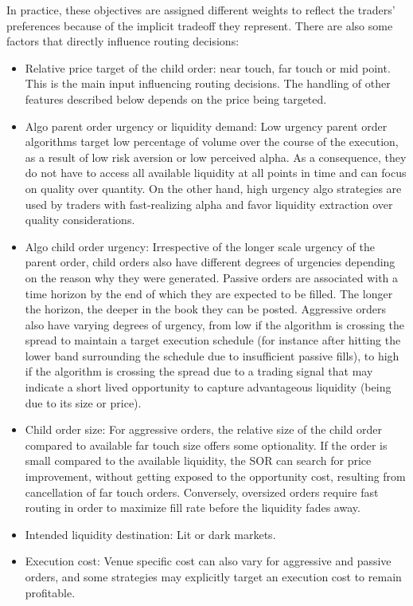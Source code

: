 In practice, these objectives are assigned different weights to reflect the traders' preferences because of the implicit tradeoff they represent. There are also some factors that directly influence routing decisions:


\begin{itemize}
\item Relative price target of the child order: near touch, far touch or mid point. This is the main input influencing routing decisions. The handling of other features described below depends on the price being targeted.

\item Algo parent order urgency or liquidity demand: Low urgency parent order algorithms target low percentage of volume over the course of the execution, as a result of low risk aversion or low perceived alpha. As a consequence, they do not have to access all available liquidity at all points in time and can focus on quality over quantity. On the other hand, high urgency algo strategies are used by traders with fast-realizing alpha and favor liquidity extraction over quality considerations.

\item Algo child order urgency: Irrespective of the longer scale urgency of the parent order, child orders also have different degrees of urgencies depending on the reason why they were generated. Passive orders are associated with a time horizon by the end of which they are expected to be filled. The longer the horizon, the deeper in the book they can be posted. Aggressive orders also have varying degrees of urgency, from low if the algorithm is crossing the spread to maintain a target execution schedule (for instance after hitting the lower band surrounding the schedule due to insufficient passive fills), to high if the algorithm is crossing the spread due to a trading signal that may indicate a short lived opportunity to capture advantageous liquidity (being due to its size or price).

\item Child order size: For aggressive orders, the relative size of the child order compared to available far touch size offers some optionality. If the order is small compared to the available liquidity, the SOR can search for price improvement, without getting exposed to the opportunity cost, resulting from cancellation of far touch orders. Conversely, oversized orders require fast routing in order to maximize fill rate before the liquidity fades away.

\item Intended liquidity destination: Lit or dark markets.

\item Execution cost: Venue specific cost can also vary for aggressive and passive orders, and some strategies may explicitly target an execution cost to remain profitable. \twomedskip
\end{itemize}


